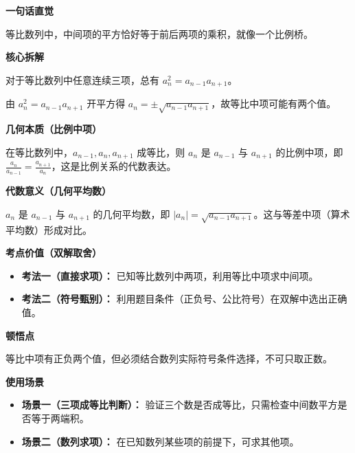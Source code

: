 \begin{explanationbox}

	\textbf{\textcolor{CExplanation}{一句话直觉}}

	等比数列中，中间项的平方恰好等于前后两项的乘积，就像一个比例桥。

	\medskip
	\textbf{\textcolor{CExplanation}{核心拆解}}
	\begin{description}[style=nextline, leftmargin=2.8em, labelsep=0.5em, itemsep=0.45em]
		\item[\textbf{要点一（公式形式）：}] 对于等比数列中任意连续三项，总有 $a_n^2 = a_{n-1}a_{n+1}$。
		\item[\textbf{要点二（符号多解）：}] 由 $a_n^2 = a_{n-1}a_{n+1}$ 开平方得 $a_n = \pm\sqrt{a_{n-1}a_{n+1}}$，故等比中项可能有两个值。
	\end{description}

	\medskip
	\textbf{\textcolor{CExplanation}{几何本质（比例中项）}}

	在等比数列中，$a_{n-1},a_n,a_{n+1}$ 成等比，则 $a_n$ 是 $a_{n-1}$ 与 $a_{n+1}$ 的比例中项，即 $\frac{a_n}{a_{n-1}} = \frac{a_{n+1}}{a_n}$，这是比例关系的代数表达。

	\medskip
	\textbf{\textcolor{CExplanation}{代数意义（几何平均数）}}

	$a_n$ 是 $a_{n-1}$ 与 $a_{n+1}$ 的几何平均数，即 $|a_n| = \sqrt{a_{n-1}a_{n+1}}$。这与等差中项（算术平均数）形成对比。

	\medskip
	\textbf{\textcolor{CExplanation}{考点价值（双解取舍）}}
	\begin{itemize}[leftmargin=*, itemsep=0.5em, topsep=0.4em]
		\item \textbf{考法一（直接求项）：} 已知等比数列中两项，利用等比中项求中间项。
		\item \textbf{考法二（符号甄别）：} 利用题目条件（正负号、公比符号）在双解中选出正确值。
	\end{itemize}

	\medskip
	\textbf{\textcolor{CExplanation}{顿悟点}}

	等比中项有正负两个值，但必须结合数列实际符号条件选择，不可只取正数。

	\medskip
	\textbf{\textcolor{CExplanation}{使用场景}}
	\begin{itemize}[leftmargin=*, itemsep=0.5em, topsep=0.4em]
		\item \textbf{场景一（三项成等比判断）：} 验证三个数是否成等比，只需检查中间数平方是否等于两端积。
		\item \textbf{场景二（数列求项）：} 在已知数列某些项的前提下，可求其他项。
	\end{itemize}
\end{explanationbox}

